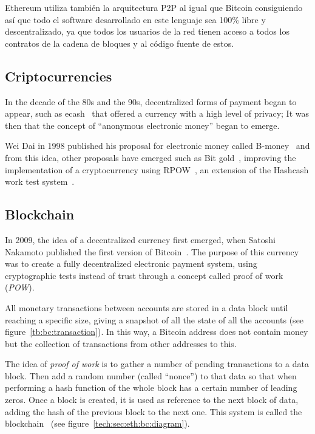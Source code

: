 Ethereum utiliza también la arquitectura P2P al igual que Bitcoin consiguiendo
así que todo el software desarrollado en este lenguaje sea 100\% libre y
descentralizado, ya que todos los usuarios de la red tienen acceso a todos los
contratos de la cadena de bloques y al código fuente de estos.
\subsection{Criptocurrencies}
\label{tb:cryptos}
In the decade of the 80s and the 90s, decentralized forms of payment began to
appear, such as ecash~\cite{chaum1995introduction} that offered a currency with
a high level of privacy; It was then that the concept of ``anonymous electronic
money'' began to emerge.

Wei Dai in 1998 published his proposal for electronic money called
B-money~\cite{bmoney} and from this idea, other proposals have emerged such as
Bit gold~\cite{bitgold}, improving the implementation of a cryptocurrency using
RPOW~\cite{finney2005rpow}, an extension of the Hashcash work test
system~\cite{back2002hashcash}.

\subsection{Blockchain}
\label{tb:bc}


In 2009, the idea of a decentralized currency first emerged, when Satoshi
Nakamoto published the first version of Bitcoin~\cite{nakamoto2008bitcoin}. The
purpose of this currency was to create a fully decentralized electronic payment
system, using cryptographic tests instead of trust through a concept called
proof of work (\emph{POW}).

All monetary transactions between accounts are stored in a data block until
reaching a specific size, giving a snapshot of all the state of all the accounts
(see figure~\ref{tb:bc:transaction}). In this way, a Bitcoin address does not
contain money but the collection of transactions from other addresses to this.

The idea of \emph{proof of work} is to gather a number of pending transactions
to a data block. Then add a random number (called ``nonce'') to that data so that
when performing a hash function of the whole block has a certain number of
leading zeros. Once a block is created, it is used as reference to the next
block of data, adding the hash of the previous block to the next one. This
system is called the blockchain~\cite{antonopoulos2014mastering} (see
figure~\ref{tech:sec:eth:bc:diagram}).

